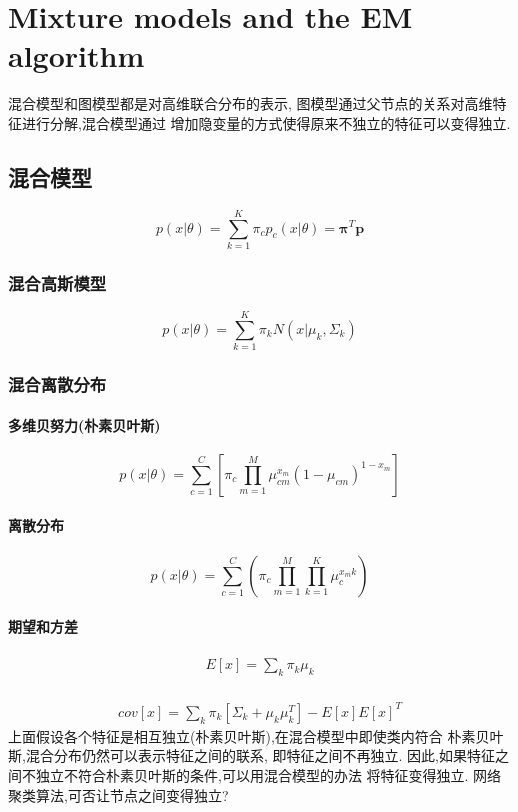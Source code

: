 \chapter{Mixture models and the EM algorithm}
混合模型和图模型都是对高维联合分布的表示,
图模型通过父节点的关系对高维特征进行分解,混合模型通过
增加隐变量的方式使得原来不独立的特征可以变得独立.
\section{混合模型}
\begin{equation}
p(x|\theta) = \sum_{k = 1}^K\pi_cp_c(x|\theta) =
\mathbf{\pi}^T\mathbf{p}
\end{equation}
\subsection{混合高斯模型}
\begin{equation}
p(x|\theta) = \sum_{k = 1}^K\pi_kN(x|\mu_k, \Sigma_k)
\end{equation}

\subsection{混合离散分布}
\subsubsection{多维贝努力(朴素贝叶斯)}
\begin{equation}
p(x|\theta) = \sum_{c = 1}^C[\pi_c\prod_{m=1}^M\mu_{cm}^{x_m}(1-\mu_{cm})^{1-x_m}]
\end{equation}
\subsubsection{离散分布}
\begin{equation}
p(x|\theta) = \sum_{c = 1}^C(\pi_c\prod_{m=1}^M\prod_{k=1}^K\mu_c^{x_mk})
\end{equation}
\subsubsection{期望和方差}
\begin{equation}
\begin{aligned}
E[x] = \sum_k\pi_k\mu_k\\
\end{aligned}
\end{equation}

\begin{equation}
\begin{aligned}
cov[x] = \sum_k\pi_k[\Sigma_k+\mu_k\mu_k^T] - E[x]E[x]^T
\end{aligned}
\end{equation}
上面假设各个特征是相互独立(朴素贝叶斯),在混合模型中即使类内符合
朴素贝叶斯,混合分布仍然可以表示特征之间的联系, 即特征之间不再独立.
因此,如果特征之间不独立不符合朴素贝叶斯的条件,可以用混合模型的办法
将特征变得独立. 网络聚类算法,可否让节点之间变得独立?

